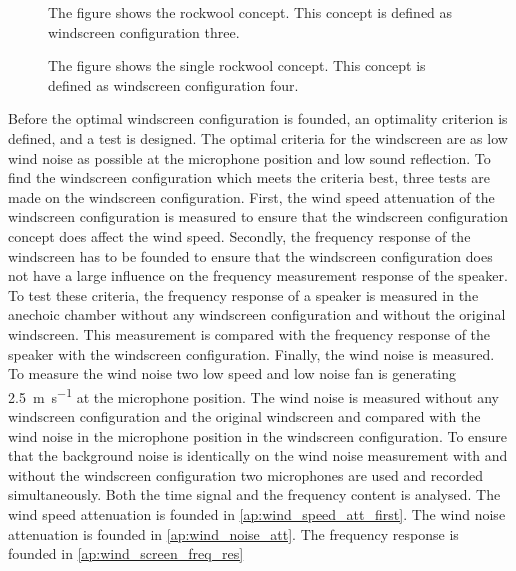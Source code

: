 \begin{figure}[H]
    \centering
     \captionsetup{width=1\linewidth}
    \begin{minipage}{0.46\textwidth}
         \captionsetup{width=0.90\linewidth}
       
        \caption{The figure shows the rockwool concept. This concept is defined as windscreen configuration three.}
        \label{fig:td:mes_roc_con}
    \end{minipage}%
    \begin{minipage}{0.46\textwidth}
        \centering
         \captionsetup{width=0.90\linewidth}
        
        \caption{The figure shows the single rockwool concept. This concept is defined as windscreen configuration four.}
        \label{fig:td:mes_roc_sin_con}
    \end{minipage}
\end{figure}


 

Before the optimal windscreen configuration is founded, an optimality criterion is defined, and a test is designed. The optimal criteria for the windscreen are as low wind noise as possible at the microphone position and low sound reflection. To find the windscreen configuration which meets the criteria best, three tests are made on the windscreen configuration. First, the wind speed attenuation of the windscreen configuration is measured to ensure that the windscreen configuration concept does affect the wind speed. Secondly, the frequency response of the windscreen has to be founded to ensure that the windscreen configuration does not have a large influence on the frequency measurement response of the speaker. To test these criteria, the frequency response of a speaker is measured in the anechoic chamber without any windscreen configuration and without the original windscreen. This measurement is compared with the frequency response of the speaker with the windscreen configuration. Finally, the wind noise is measured. To measure the wind noise two low speed and low noise fan is generating \SI{2.5}{\meter\per\second} at the microphone position. The wind noise is measured without any windscreen configuration and the original windscreen and compared with the wind noise in the microphone position in the windscreen configuration. To ensure that the background noise is identically on the wind noise measurement with and without the windscreen configuration two microphones are used and recorded simultaneously. Both the time signal and the frequency content is analysed. The wind speed attenuation is founded in \autoref{ap:wind_speed_att_first}. The wind noise attenuation is founded in \autoref{ap:wind_noise_att}. The frequency response is founded in \autoref{ap:wind_screen_freq_res}


